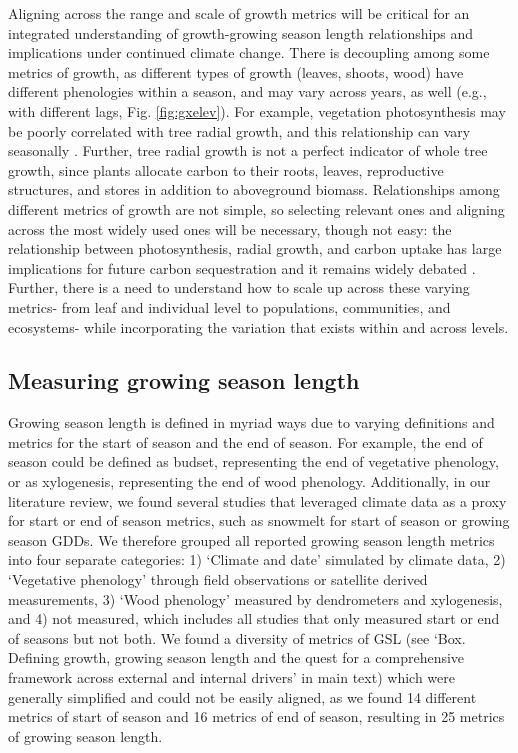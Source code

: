 \documentclass[11pt]{article}
\begin{document}
Aligning across the range and scale of growth metrics will be critical for an integrated understanding of growth-growing season length relationships and implications under continued climate change.  
There is decoupling among some metrics of growth, as different types of growth (leaves, shoots, wood) have different phenologies within a season, and may vary across years, as well (e.g., with different lags, Fig. \ref{fig:gxelev}).
For example, vegetation photosynthesis may be poorly correlated with tree radial growth, and this relationship can vary seasonally \citep{cabon2022cross}. 
Further, tree radial growth is not a perfect indicator of whole tree growth, since plants allocate carbon to their roots, leaves, reproductive structures, and stores in addition to aboveground biomass. 
Relationships among different metrics of growth are not simple, so selecting relevant ones and aligning across the most widely used ones will be necessary, though not easy: the relationship  between photosynthesis, radial growth, and carbon uptake has large implications for future carbon sequestration and it remains widely debated \citep{green2022limits}. 
Further, there is a need to understand how to scale up across these varying metrics- from leaf and individual level to populations, communities, and ecosystems- while incorporating the variation that exists within and across levels.

\subsection*{Measuring growing season length}

Growing season length is defined in myriad ways due to varying definitions and metrics for the start of season and the end of season. For example, the end of season could be defined as budset, representing the end of vegetative phenology, or as xylogenesis, representing the end of wood phenology. Additionally, in our literature review, we found several studies that leveraged climate data as a proxy for start or end of season metrics, such as snowmelt for start of season or growing season GDDs. We therefore grouped all reported growing season length metrics into four separate categories: 1) `Climate and date' simulated by climate data, 2) `Vegetative phenology' through field observations or satellite derived measurements, 3) `Wood phenology' measured by dendrometers and xylogenesis, and 4) not measured, which includes all studies that only measured start or end of seasons but not both. We found a diversity of metrics of GSL (see `Box. Defining growth, growing season length and the quest for a comprehensive framework across external and internal drivers' in main text) which were generally simplified and could not be easily aligned, as we found 14 different metrics of start of season and 16 metrics of end of season, resulting in  25 metrics of growing season length. 
\end{document}
